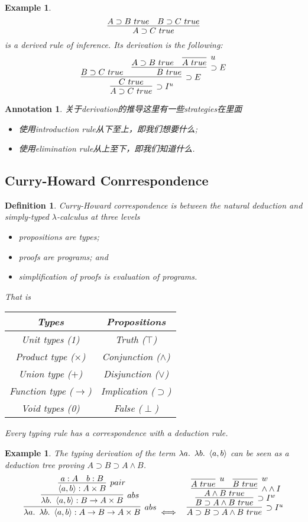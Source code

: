 \documentclass{article}
\theoremstyle{plain}
\newtheorem{example}[theorem]{Example}
\newtheorem{definition}[theorem]{Definition}
\newtheorem{annotation}[theorem]{Annotation}
\theoremstyle{nonumberplain}
\newcommand{\lam}[2]{\ensuremath{\lambda #1\ldotp~ #2}} %
\begin{document}
\begin{example}
\rm 
$$
\infer{A \supset C~true}{A \supset B~true & B \supset C~true}
$$
is a derived rule of inference. Its derivation is the following:
$$
\infer[\supset I^u]{A \supset C~true}{\infer[\supset E]{C~true}{B \supset C~true & \infer[\supset E]{B~true}{A \supset B~true & \infer[u]{A~true}{}}}}
$$
\end{example}

\begin{annotation}
\rm 关于derivation的推导这里有一些strategies在里面
\begin{itemize}
	\item 使用introduction rule从下至上，即我们想要什么;
	\item 使用elimination rule从上至下，即我们知道什么.
\end{itemize}
\end{annotation}


\newpage
\subsection{Curry-Howard Conrrespondence}

\begin{definition}
\rm Curry-Howard correspondence is between the natural deduction and simply-typed $\lambda$-calculus at three levels
\begin{itemize}
	\item propositions are types;
	\item proofs are programs; and
	\item simplification of proofs is evaluation of programs.
\end{itemize}
That is
\begin{center}
\begin{tabular}{c|c}
Types & Propositions \\
\hline
Unit types (1) & Truth ($\top$)\\
\hline
Product type ($\times$) & Conjunction ($\wedge$) \\
\hline
Union type ($+$)& Disjunction ($\vee$) \\
\hline
Function type ($\to$) & Implication ($\supset$)\\
\hline
Void types (0) & False ($\perp$)
\end{tabular}
\end{center}
Every typing rule has a correspondence with a deduction rule. 
\end{definition}


\begin{example}
\rm The typing derivation of the term $\lam{a}{\lam{b}{\left<a,b\right>}}$ can be seen as a deduction tree proving $A \supset B \supset A \wedge B$.
\[
\begin{aligned}
	\infer[abs]{\lam{a}{\lam{b}{\left<a,b\right>}}:A \to B \to A \times B}{\infer[abs]{\lam{b}{\left<a,b\right>}:B \to A \times B}{\infer[pair]{\left<a,b\right>: A \times B}{a:A & b:B}}} & \iff & 
	\infer[\supset I^u]{A \supset B \supset A \wedge B~true}{\infer[\supset I^w]{B \supset A \wedge B~true}{\infer[\wedge \wedge I]{A \wedge B ~true}{\infer[u]{A~true}{} & \infer[w]{B~true}{}}}}		
\end{aligned}
\]
\end{example}
\end{document}
